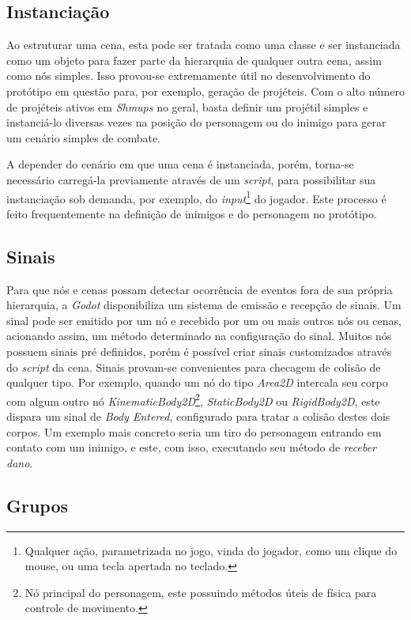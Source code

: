 \subsection{Instanciação}

Ao estruturar uma cena, esta pode ser tratada como uma classe e ser instanciada como um objeto para fazer parte da hierarquia de qualquer outra cena, assim como nós simples. Isso provou-se extremamente útil no desenvolvimento do protótipo em questão para, por exemplo, geração de projéteis. Com o alto número de projéteis ativos em \textit{Shmups} no geral, basta definir um projétil simples e instanciá-lo diversas vezes na posição do personagem ou do inimigo para gerar um cenário simples de combate.

A depender do cenário em que uma cena é instanciada, porém, torna-se necessário carregá-la previamente através de um \textit{script}, para possibilitar sua instanciação sob demanda, por exemplo, do \textit{input}\footnote{
    Qualquer ação, parametrizada no jogo, vinda do jogador, como um clique do mouse, ou uma tecla apertada no teclado.
} do jogador. Este processo é feito frequentemente na definição de inimigos e do personagem no protótipo.

\subsection{Sinais}

Para que nós e cenas possam detectar ocorrência de eventos fora de sua própria hierarquia, a \textit{Godot} disponibiliza um sistema de emissão e recepção de sinais. Um sinal pode ser emitido por um nó e recebido por um ou mais outros nós ou cenas, acionando assim, um método determinado na configuração do sinal. Muitos nós possuem sinais pré definidos, porém é possível criar sinais customizados através do \textit{script} da cena. Sinais provam-se convenientes para checagem de colisão de qualquer tipo. Por exemplo, quando um nó do tipo \textit{Area2D} intercala seu corpo com algum outro nó \textit{KinematicBody2D}\footnote{
    Nó principal do personagem, este possuindo métodos úteis de física para controle de movimento.
}, \textit{StaticBody2D} ou \textit{RigidBody2D}, este dispara um sinal de \textit{Body Entered}, configurado para tratar a colisão destes dois corpos. Um exemplo mais concreto seria um tiro do personagem entrando em contato com um inimigo, e este, com isso, executando seu método de \textit{receber dano}.

\subsection{Grupos}\label{Grupos}

